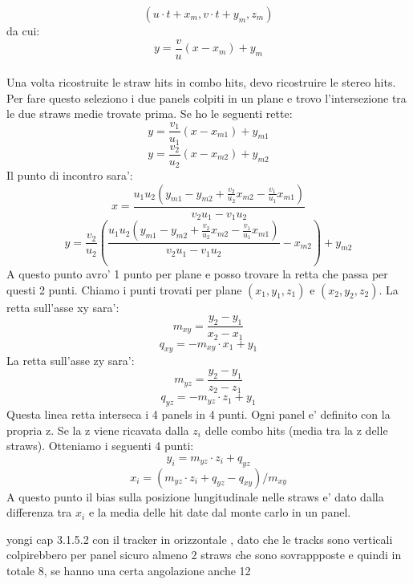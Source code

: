 $$ (u\cdot t + x_m,v\cdot t + y_m,z_m)$$
da cui:
$$y=\frac{v}{u}(x-x_m)+y_m$$
\\
Una volta ricostruite le straw hits in combo hits, devo ricostruire le stereo hits.
Per fare questo seleziono i due panels colpiti in un plane e trovo l'intersezione tra le due straws medie trovate prima. Se ho le seguenti rette:
$$y=\frac{v_1}{u_1}(x-x_{m1})+y_{m1}$$
$$y=\frac{v_2}{u_2}(x-x_{m2})+y_{m2}$$
Il punto di incontro sara':
$$x=\frac{u_1 u_2(y_{m1}-y_{m2}+\frac{v_2}{u_2}x_{m2}-\frac{v_1}{u_1}x_{m1})}{v_2 u_1 - v_1 u_2}$$
$$y=\frac{v_2}{u_2}\left(\frac{u_1 u_2(y_{m1}-y_{m2}+\frac{v_2}{u_2}x_{m2}-\frac{v_1}{u_1}x_{m1})}{v_2 u_1 - v_1 u_2}-x_{m2}\right)+y_{m2}$$
A questo punto avro' 1 punto per plane e posso trovare la retta che passa per questi 2 punti. Chiamo i punti trovati per plane $(x_1,y_1,z_1)$ e $(x_2,y_2,z_2)$.
La retta sull'asse xy sara':
$$ m_{xy}=\frac{y_2-y_1}{x_2-x_1}$$
$$ q_{xy}=-m_{xy} \cdot x_1+y_1$$
La retta sull'asse zy sara':
$$ m_{yz}=\frac{y_2-y_1}{z_2-z_1}$$
$$ q_{yz}=-m_{yz} \cdot z_1+y_1$$
Questa linea retta interseca i 4 panels in 4 punti. Ogni panel e' definito con la propria z. Se la z viene ricavata dalla $z_i$ delle combo hits (media tra la z delle straws). Otteniamo i seguenti 4 punti:
$$ y_i=m_{yz}\cdot z_i+q_{yz}$$
$$ x_i=(m_{yz}\cdot z_i+q_{yz}-q_{xy})/m_{xy}$$
A questo punto il bias sulla posizione lungitudinale nelle straws e' dato dalla differenza tra $x_i$ e la media delle hit date dal monte carlo in un panel.



yongi cap 3.1.5.2
con il tracker in orizzontale , dato che le tracks sono verticali colpirebbero per panel sicuro almeno 2 straws che sono sovrappposte e quindi in totale 8, se hanno una certa angolazione anche 12






